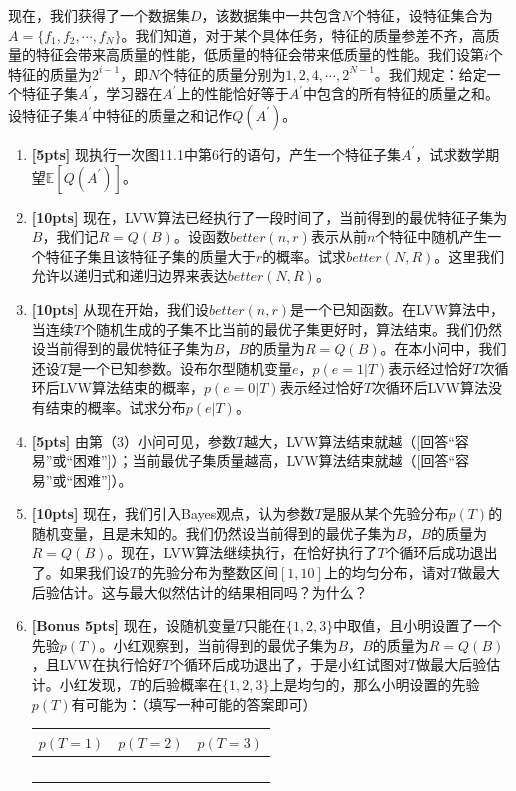 \documentclass[a4paper,UTF8]{article}
\numberwithin{equation}{section}
\begin{document}
现在，我们获得了一个数据集$D$，该数据集中一共包含$N$个特征，设特征集合为$A=\{f_1,f_2,\cdots,f_N\}$。我们知道，对于某个具体任务，特征的质量参差不齐，高质量的特征会带来高质量的性能，低质量的特征会带来低质量的性能。我们设第$i$个特征的质量为$2^{i-1}$，即$N$个特征的质量分别为$1,2,4,\cdots,2^{N-1}$。我们规定：给定一个特征子集$A^\prime$，学习器在$A^\prime$上的性能恰好等于$A^\prime$中包含的所有特征的质量之和。设特征子集$A^\prime$中特征的质量之和记作$Q(A^\prime)$。

\begin{enumerate}[(1)]
\item \textbf{[5pts]} 现执行一次图11.1中第$6$行的语句，产生一个特征子集$A^\prime$，试求数学期望$\mathbb{E}[Q(A^\prime)]$。

\item \textbf{[10pts]} 现在，LVW算法已经执行了一段时间了，当前得到的最优特征子集为$B$，我们记$R=Q(B)$。设函数$better(n,r)$表示从前$n$个特征中随机产生一个特征子集且该特征子集的质量大于$r$的概率。试求$better(N,R)$。这里我们允许以递归式和递归边界来表达$better(N,R)$。
    
\item \textbf{[10pts]} 从现在开始，我们设$better(n,r)$是一个已知函数。在LVW算法中，当连续$T$个随机生成的子集不比当前的最优子集更好时，算法结束。我们仍然设当前得到的最优特征子集为$B$，$B$的质量为$R=Q(B)$。在本小问中，我们还设$T$是一个已知参数。设布尔型随机变量$e$，$p(e=1|T)$表示经过恰好$T$次循环后LVW算法结束的概率，$p(e=0|T)$表示经过恰好$T$次循环后LVW算法没有结束的概率。试求分布$p(e|T)$。

\item \textbf{[5pts]} 由第（3）小问可见，参数$T$越大，LVW算法结束就越（[回答“容易”或“困难”]）；当前最优子集质量越高，LVW算法结束就越（[回答“容易”或“困难”]）。

\item \textbf{[10pts]} 现在，我们引入Bayes观点，认为参数$T$是服从某个先验分布$p(T)$的随机变量，且是未知的。我们仍然设当前得到的最优子集为$B$，$B$的质量为$R=Q(B)$。现在，LVW算法继续执行，在恰好执行了$T$个循环后成功退出了。如果我们设$T$的先验分布为整数区间$[1, 10]$上的均匀分布，请对$T$做最大后验估计。这与最大似然估计的结果相同吗？为什么？

\item \textbf{[Bonus 5pts]} 现在，设随机变量$T$只能在$\{1,2,3\}$中取值，且小明设置了一个先验$p(T)$。小红观察到，当前得到的最优子集为$B$，$B$的质量为$R=Q(B)$，且LVW在执行恰好$T$个循环后成功退出了，于是小红试图对$T$做最大后验估计。小红发现，$T$的后验概率在$\{1,2,3\}$上是均匀的，那么小明设置的先验$p(T)$有可能为：（填写一种可能的答案即可）
\begin{table}
	\centering
    \begin{tabular}{|l|l|l|}
        \hline
        $p(T=1)$ & $p(T=2)$ & $p(T=3)$ \\ \hline
        ~      & ~      & ~      \\
        \hline
    \end{tabular}
\end{table}
\end{enumerate}
\end{document}

